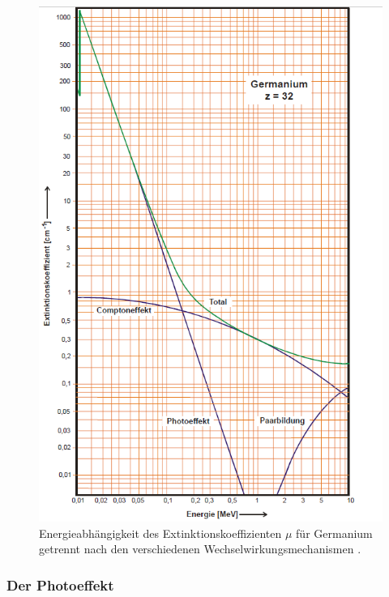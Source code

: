 \begin{figure}
	\centering
	\includegraphics[width=\linewidth-70pt,height=\textheight-70pt,keepaspectratio]{content/images/sigma.png}
	\caption{Energieabhängigkeit des Extinktionskoeffizienten $\mu$ für Germanium getrennt nach den verschiedenen Wechselwirkungsmechanismen \cite{V18}.}
	\label{fig:Wirkungsquerschnitt}
\end{figure}

\subsubsection{Der Photoeffekt}

